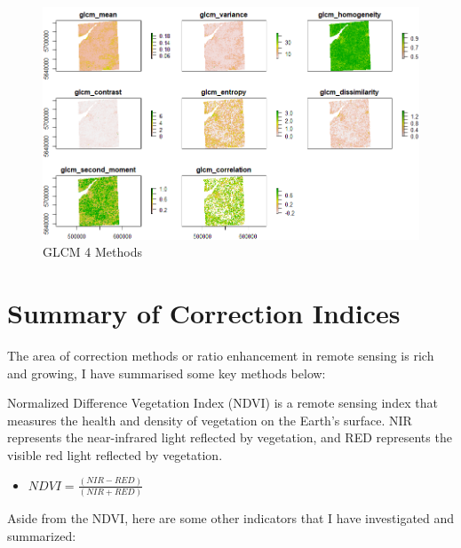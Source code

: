 \documentclass[
  letterpaper,
  DIV=11,
  numbers=noendperiod]{scrreprt}
\providecommand{\tightlist}{%
  \setlength{\itemsep}{0pt}\setlength{\parskip}{0pt}}\usepackage{longtable,booktabs,array}
\begin{document}
\begin{figure}

{\centering \includegraphics[width=6.75in,height=\textheight]{images/wk3/glcm.png}

}

\caption{GLCM 4 Methods}

\end{figure}

\hypertarget{summary-of-correction-indices}{%
\section*{Summary of Correction
Indices}\label{summary-of-correction-indices}}


The area of correction methods or ratio enhancement in remote sensing is
rich and growing, I have summarised some key methods below:

Normalized Difference Vegetation Index (NDVI) is a remote sensing index
that measures the health and density of vegetation on the Earth's
surface. NIR represents the near-infrared light reflected by vegetation,
and RED represents the visible red light reflected by vegetation.

\begin{itemize}
\tightlist
\item
  \(NDVI = \frac{(NIR - RED)}{(NIR+RED)}\)
\end{itemize}

Aside from the NDVI, here are some other indicators that I have
investigated and summarized:
\end{document}
